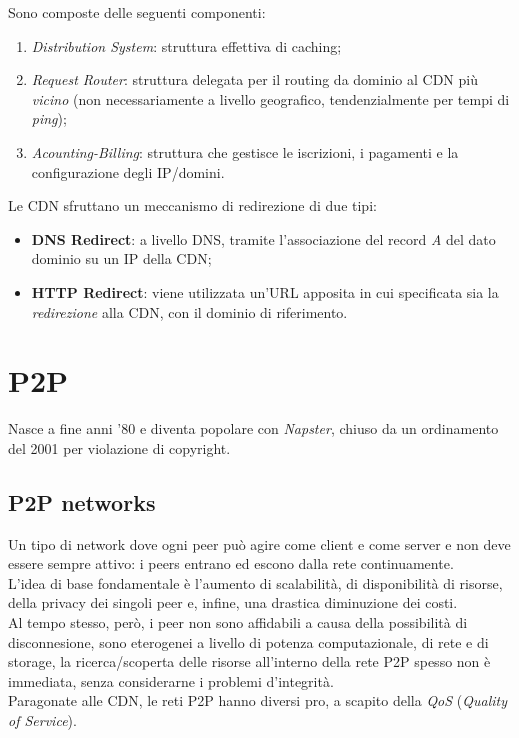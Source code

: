 Sono composte delle seguenti componenti:
\begin{enumerate}
    \item \textit{Distribution System}: struttura effettiva di caching;
    \item \textit{Request Router}: struttura delegata per il routing da dominio al CDN più \textit{vicino} (non necessariamente a livello geografico, tendenzialmente per tempi di \textit{ping});
    \item \textit{Acounting-Billing}: struttura che gestisce le iscrizioni, i pagamenti e la configurazione degli IP/domini.
\end{enumerate}
Le CDN sfruttano un meccanismo di redirezione di due tipi:
\begin{itemize}
    \item \textbf{DNS Redirect}: a livello DNS, tramite l'associazione del record \textit{A} del dato dominio su un IP della CDN;
    \item \textbf{HTTP Redirect}: viene utilizzata un'URL apposita in cui specificata sia la \textit{redirezione} alla CDN, con il dominio di riferimento.
\end{itemize}

\section{P2P}
Nasce a fine anni '80 e diventa popolare con \textit{Napster}, chiuso da un ordinamento del 2001 per violazione di copyright. \\

\subsection{P2P networks}
Un tipo di network dove ogni peer può agire come client e come server e non deve essere sempre attivo: i peers entrano ed escono dalla rete continuamente. \\
L'idea di base fondamentale è l'aumento di scalabilità, di disponibilità di risorse, della privacy dei singoli peer e, infine, una drastica diminuzione dei costi. \\
Al tempo stesso, però, i peer non sono affidabili a causa della possibilità di disconnesione, sono eterogenei a livello di potenza computazionale, di rete e di storage, la ricerca/scoperta delle risorse all'interno della rete P2P spesso non è immediata, senza considerarne i problemi d'integrità. \\
Paragonate alle CDN, le reti P2P hanno diversi pro, a scapito della \textit{QoS} (\textit{Quality of Service}).

